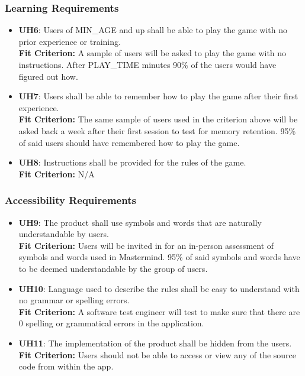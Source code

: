 \documentclass[12pt, titlepage]{article}
\begin{document}
\subsubsection{Learning Requirements}
\begin{itemize}
    \item \textbf{UH6}: Users of MIN\_AGE and up shall be able to play the game with no prior experience or training.\\
    \textbf{Fit Criterion:} A sample of users will be asked to play the game with no instructions. After PLAY\_TIME minutes 90\% of the users would have figured out how.
    \item \textbf{UH7}: Users shall be able to remember how to play the game after their first experience.\\
    \textbf{Fit Criterion:} The same sample of users used in the criterion above will be asked back a week after their first session to test for memory retention. 95\% of said users should have remembered how to play the game. 
    \item \textbf{UH8}: Instructions shall be provided for the rules of the game.\\
    \textbf{Fit Criterion:} N/A

\end{itemize}

\subsubsection{Accessibility Requirements}
\begin{itemize}
\item \textbf{UH9}: The product shall use symbols and words that are naturally understandable by users. \\
\textbf{Fit Criterion:} Users will be invited in for an in-person assessment of symbols and words used in Mastermind. 95\% of said symbols and words have to be deemed understandable by the group of users. 
\item \textbf{UH10}: Language used to describe the rules shall be easy to understand with no grammar or spelling errors.\\
\textbf{Fit Criterion:} A software test engineer will test to make sure that there are 0 spelling or grammatical errors in the application.
\item \textbf{UH11}: The implementation of the product shall be hidden from the users.\\
\textbf{Fit Criterion:} Users should not be able to access or view any of the source code from within the app.
\end{itemize}
\end{document}
